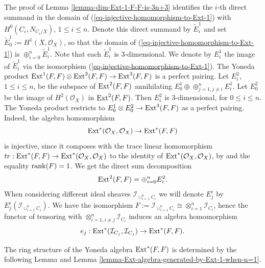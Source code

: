 \documentclass[12pt]{amsart}
\numberwithin{equation}{subsection}
\theoremstyle{plain}
\theoremstyle{definition}
\newcommand{\StructureSheaf}[1]{{\mathcal O}_{#1}}
\newcommand{\rank}{{\rm rank}}
\newcommand{\Ext}{{\rm Ext}}
\newcommand{\Ideal}[1]{{\mathcal I}_{#1}}
\begin{document}
The proof of Lemma \ref{lemma-dim-Ext-1-F-F-is-3n+3} identifies the $i$-th direct summand in the domain of (\ref{eq-injective-homomorphism-to-Ext-1})
with $H^0(C_i,N_{C_i/X})$, $1\leq i\leq n$. Denote this direct summand by $\tilde{E}^1_i$ and set $\tilde{E}_0^1:=H^1(X,\StructureSheaf{X})$, so that the domain of (\ref{eq-injective-homomorphism-to-Ext-1})
is $\oplus_{i=0}^n \tilde{E}^1_i$. 
Note that each $\tilde{E}^1_i$ is $3$-dimensional. 
We denote by $E^1_i$ the image of $\tilde{E}^1_i$ via the isomorphism (\ref{eq-injective-homomorphism-to-Ext-1}).
The Yoneda product $\Ext^1(F,F)\otimes \Ext^2(F,F)\rightarrow \Ext^3(F,F)$ is a perfect pairing. 
Let $E^2_i$, $1\leq i\leq n$, be the subspace of $\Ext^2(F,F)$ 
annihilating $E^1_0\oplus \oplus_{j=1, j\neq i}^nE^1_i$. Let $E^2_0$ be the image of $H^2(\StructureSheaf{X})$ in $\Ext^2(F,F)$. 
Then $E^2_i$ is $3$-dimensional, for $0\leq i\leq n$. The Yoneda product restricts to $E^1_0\otimes E^2_0\rightarrow \Ext^3(F,F)$ as a perfect pairing. Indeed, the algebra homomorphism 
\[
\Ext^*(\StructureSheaf{X},\StructureSheaf{X})\rightarrow \Ext^*(F,F)
\] 
is injective, since it composes with the trace linear homomorphism 
$tr:\Ext^*(F,F)\rightarrow \Ext^*(\StructureSheaf{X},\StructureSheaf{X})$  to the identity of $\Ext^*(\StructureSheaf{X},\StructureSheaf{X})$, by \cite[10.1.3]{huybrechts-lehn} and the equality $\rank(F)=1$.
We get the direct sum decomposition
\[
\Ext^2(F,F)=\oplus_{i=0}^n E^2_i.
\]
When considering different ideal sheaves $\Ideal{\cup_{i=1}^nC_i}$ we will denote $E^i_j$  by $E^i_j(\Ideal{\cup_{i=1}^nC_i})$.
We have the isomorphism $F:=\Ideal{\cup_{i=1}^n C_i}\cong \otimes_{i=1}^n\Ideal{C_i}$, hence the functor of tensoring with $\otimes_{i=1,i\neq j}^n\Ideal{C_i}$ induces an algebra homomorphism
\[
e_j:\Ext^*(\Ideal{C_j},\Ideal{C_j})\rightarrow \Ext^*(F,F).
\]

The ring structure of the Yoneda algebra $\Ext^*(F,F)$ is determined by the following Lemma and Lemma \ref{lemma-Ext-algebra-generated-by-Ext-1-when-n=1}.
\end{document}
